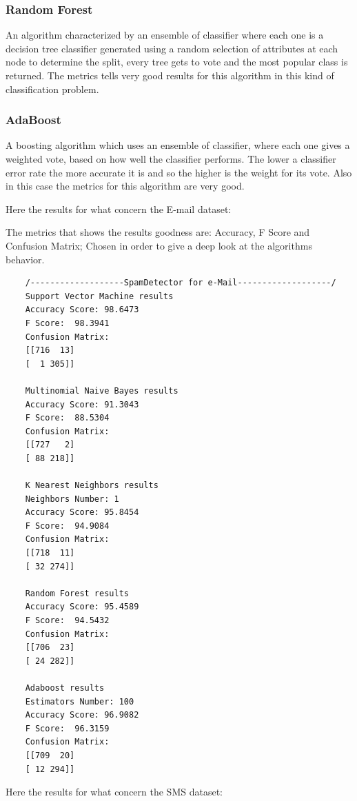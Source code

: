 \documentclass[a4paper]{report}
\begin{document}
\subsubsection{Random Forest}
An algorithm characterized by an ensemble of classifier where each one is a decision tree classifier generated using a random selection of attributes at each node to determine the split, every tree gets to vote and the most popular class is returned. The metrics tells very good results for this algorithm in this kind of classification problem.

\subsubsection{AdaBoost}
A boosting algorithm which uses an ensemble of classifier, where each one gives a weighted vote, based on how well the classifier performs. The lower a classifier error rate the more accurate it is and so the higher is the weight for its vote. Also in this case the metrics for this algorithm are very good.

\newpage
\noindent Here the results for what concern the E-mail dataset:

\noindent The metrics that shows the results goodness are: Accuracy, F Score and Confusion Matrix; Chosen in order to give a deep look at the algorithms behavior.

\begin{lstlisting}
	/-------------------SpamDetector for e-Mail-------------------/
	Support Vector Machine results
	Accuracy Score: 98.6473
	F Score:  98.3941
	Confusion Matrix:
	[[716  13]
	[  1 305]]
	
	Multinomial Naive Bayes results
	Accuracy Score: 91.3043
	F Score:  88.5304
	Confusion Matrix:
	[[727   2]
	[ 88 218]]
	
	K Nearest Neighbors results
	Neighbors Number: 1
	Accuracy Score: 95.8454
	F Score:  94.9084
	Confusion Matrix:
	[[718  11]
	[ 32 274]]
	
	Random Forest results
	Accuracy Score: 95.4589
	F Score:  94.5432
	Confusion Matrix:
	[[706  23]
	[ 24 282]]
	
	Adaboost results
	Estimators Number: 100
	Accuracy Score: 96.9082
	F Score:  96.3159
	Confusion Matrix:
	[[709  20]
	[ 12 294]]
\end{lstlisting}

\newpage
\noindent Here the results for what concern the SMS dataset:
\end{document}
